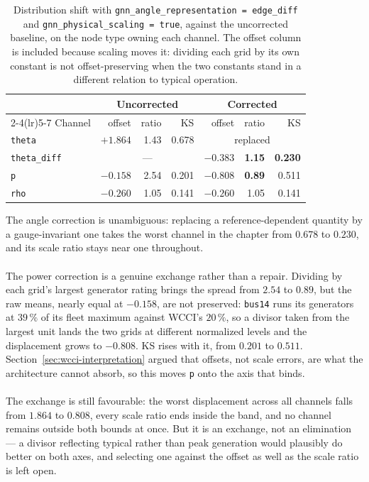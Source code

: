 \begin{table}[H]
  \centering
  \small
  \caption{Distribution shift with \texttt{gnn\_angle\_representation =
  edge\_diff} and \texttt{gnn\_physical\_scaling = true}, against the
  uncorrected baseline, on the node type owning each channel. The offset column
  is included because scaling moves it: dividing each grid by its own constant
  is not offset-preserving when the two constants stand in a different relation
  to typical operation.}
  \label{tab:wcci-corrected}
  \setlength{\tabcolsep}{6pt}
  \begin{tabular}{lrrr|rrr}
    \toprule
    & \multicolumn{3}{c|}{Uncorrected} & \multicolumn{3}{c}{Corrected} \\
    \cmidrule(lr){2-4}\cmidrule(lr){5-7}
    Channel & offset & ratio & KS & offset & ratio & KS \\
    \midrule
    \texttt{theta}      & $+1.864$ & 1.43 & 0.678 & \multicolumn{3}{c}{replaced} \\
    \texttt{theta\_diff} & \multicolumn{3}{c|}{---} & $-0.383$ & \textbf{1.15} & \textbf{0.230} \\
    \texttt{p}          & $-0.158$ & 2.54 & 0.201 & $-0.808$ & \textbf{0.89} & 0.511 \\
    \texttt{rho}        & $-0.260$ & 1.05 & 0.141 & $-0.260$ & 1.05 & 0.141 \\
    \bottomrule
  \end{tabular}
\end{table}

\noindent The angle correction is unambiguous: replacing a reference-dependent quantity
by a gauge-invariant one takes the worst channel in the chapter from $0.678$ to
$0.230$, and its scale ratio stays near one throughout.
\\
\\
The power correction is a genuine exchange rather than a repair. Dividing by
each grid's largest generator rating brings the spread from $2.54$ to $0.89$,
but the raw means, nearly equal at $-0.158$, are not preserved:
\texttt{bus14} runs its generators at $39\,\%$ of its fleet maximum against
WCCI's $20\,\%$, so a divisor taken from the largest unit lands the two grids at
different normalized levels and the displacement grows to $-0.808$. KS rises
with it, from $0.201$ to $0.511$. Section~\ref{sec:wcci-interpretation} argued
that offsets, not scale errors, are what the architecture cannot absorb, so this
moves \texttt{p} onto the axis that binds.
\\
\\
The exchange is still favourable: the worst displacement across all channels
falls from $1.864$ to $0.808$, every scale ratio ends inside the band, and no
channel remains outside both bounds at once. But it is an exchange, not an
elimination --- a divisor reflecting typical rather than peak generation would
plausibly do better on both axes, and selecting one against the offset as well as
the scale ratio is left open. 

